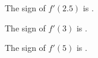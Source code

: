 \documentclass{ximera}
\begin{document}
\begin{exercise}
\begin{question}


The sign of $f'(2.5)$ is .


\end{question}









\begin{question}


The sign of $f'(3)$ is .


\end{question}









\begin{question}


The sign of $f'(5)$ is .


\end{question}


\end{exercise}
\end{document}
